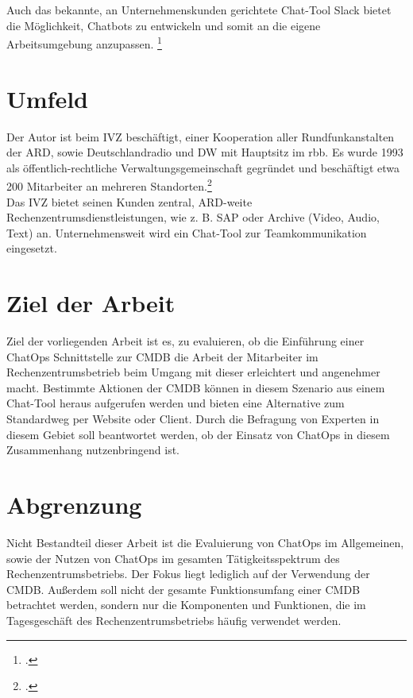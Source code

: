 Auch das bekannte, an Unternehmenskunden gerichtete Chat-Tool \acf{Slack} bietet die Möglichkeit, Chatbots zu entwickeln und somit an die eigene Arbeitsumgebung anzupassen. \footcite[Vgl.][o. \pno]{Koeltzsch_2019_Slack}


\section{Umfeld}
Der Autor ist beim \acf{IVZ} beschäftigt, einer Kooperation aller Rundfunkanstalten der \acf{ARD}, sowie Deutschlandradio und \acf{DW} mit Hauptsitz im \acf{rbb}.
Es wurde 1993 als öffentlich-rechtliche Verwaltungsgemeinschaft gegründet und beschäftigt etwa 200 Mitarbeiter an mehreren Standorten.\footcite[Vgl.][o. \pno]{ARD_2018_IVZ}\\
Das \acs{IVZ} bietet seinen Kunden zentral, \acs{ARD}-weite Rechenzentrumsdienstleistungen, wie z. B. SAP oder Archive (Video, Audio, Text) an. Unternehmensweit wird ein Chat-Tool zur Teamkommunikation eingesetzt.


\section{Ziel der Arbeit}
Ziel der vorliegenden Arbeit ist es, zu evaluieren, ob die Einführung einer ChatOps Schnittstelle zur \acf{CMDB} die Arbeit der Mitarbeiter im Rechenzentrumsbetrieb beim Umgang mit dieser erleichtert und angenehmer macht. Bestimmte Aktionen der \acs{CMDB} können in diesem Szenario aus einem Chat-Tool heraus aufgerufen werden und bieten eine Alternative zum Standardweg per Website oder Client. Durch die Befragung von Experten in diesem Gebiet soll beantwortet werden, ob der Einsatz von ChatOps in diesem Zusammenhang nutzenbringend ist.


\section{Abgrenzung}
Nicht Bestandteil dieser Arbeit ist die Evaluierung von ChatOps im Allgemeinen, sowie der Nutzen von ChatOps im gesamten Tätigkeitsspektrum des Rechenzentrumsbetriebs. Der Fokus liegt lediglich auf der Verwendung der CMDB. Außerdem soll nicht der gesamte Funktionsumfang einer \acs{CMDB} betrachtet werden, sondern nur die Komponenten und Funktionen, die im Tagesgeschäft des Rechenzentrumsbetriebs häufig verwendet werden.

